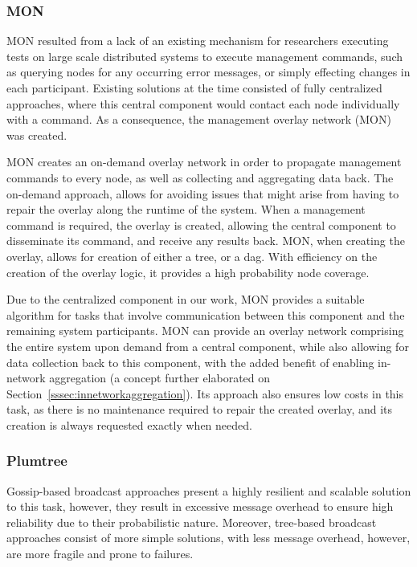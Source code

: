 \subsubsection{MON}
\label{sssec:mon}

MON\cite{Liang2005} resulted from a lack of an existing mechanism for researchers executing tests on large scale distributed systems to execute management commands, such as querying nodes for any occurring error messages, or simply effecting changes in each participant. Existing solutions at the time consisted of fully centralized approaches, where this central component would contact each node individually with a command. As a consequence, the management overlay network (MON) was created.

MON creates an on-demand overlay network in order to propagate management commands to every node, as well as collecting and aggregating data back. The on-demand approach, allows for avoiding issues that might arise from having to repair the overlay along the runtime of the system\cite{Leitao2007a}. When a management command is required, the overlay is created, allowing the central component to disseminate its command, and receive any results back. MON, when creating the overlay, allows for creation of either a tree, or a \gls{dag}. With efficiency on the creation of the overlay logic, it provides a high probability node coverage.

Due to the centralized component in our work, MON provides a suitable algorithm for tasks that involve communication between this component and the remaining system participants. MON can provide an overlay network comprising the entire system upon demand from a central component, while also allowing for data collection back to this component, with the added benefit of enabling in-network aggregation (a concept further elaborated on Section~\ref{sssec:innetworkaggregation}). Its approach also ensures low costs in this task, as there is no maintenance required to repair the created overlay, and its creation is always requested exactly when needed.

\subsubsection{Plumtree}
\label{sssec:monplumtree}

Gossip-based broadcast approaches present a highly resilient and scalable solution to this task, however, they result in excessive message overhead to ensure high reliability due to their probabilistic nature\cite{Demers1987, Birman1999, Kermarrec2003}. Moreover, tree-based broadcast approaches consist of more simple solutions, with less message overhead, however, are more fragile and prone to failures\cite{Leitao2010a}.

